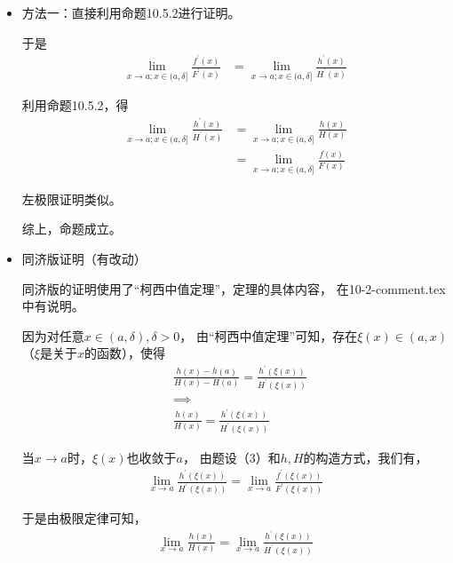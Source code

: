 \documentclass{article}
\begin{document}
\begin{itemize}
  \item  方法一：直接利用命题10.5.2进行证明。

        于是
        \begin{align*}
          \lim\limits_{x \to a; x \in (a, \delta]} \frac{f^\prime(x)}{F^\prime(x)}
           & = \lim\limits_{x \to a; x \in (a, \delta]} \frac{h^\prime(x)}{H^\prime(x)}
        \end{align*}

        利用命题10.5.2，得
        \begin{align*}
          \lim\limits_{x \to a; x \in (a, \delta]} \frac{h^\prime(x)}{H^\prime(x)}
           & = \lim\limits_{x \to a; x \in (a, \delta]} \frac{h(x)}{H(x)} \\
           & = \lim\limits_{x \to a; x \in (a, \delta]} \frac{f(x)}{F(x)}
        \end{align*}

        左极限证明类似。

        综上，命题成立。

  \item 同济版证明（有改动）

        同济版的证明使用了“柯西中值定理”，定理的具体内容，
        在10-2-comment.tex中有说明。

        因为对任意$x \in (a, \delta), \delta > 0$，
        由“柯西中值定理”可知，存在$\xi(x) \in (a, x)$（$\xi$是关于$x$的函数），使得
        \begin{align*}
           & \frac{h(x) - h(a)}{H(x) - H(a)} = \frac{h^\prime(\xi(x))}{H^\prime(\xi(x))} \\
           & \implies                                                                    \\
           & \frac{h(x)}{H(x)} = \frac{h^\prime(\xi(x))}{H^\prime(\xi(x))}
        \end{align*}

        当$x \to a$时，$\xi(x)$也收敛于$a$，
        由题设（3）和$h,H$的构造方式，我们有，
        \begin{align*}
          \lim\limits_{x \to a} \frac{h^\prime(\xi(x))}{H^\prime(\xi(x))}
          =
          \lim\limits_{x \to a} \frac{f^\prime(\xi(x))}{F^\prime(\xi(x))}
        \end{align*}

        于是由极限定律可知，
        \begin{align*}
          \lim\limits_{x \to a} \frac{h(x)}{H(x)} = \lim\limits_{x \to a} \frac{h^\prime(\xi(x))}{H^\prime(\xi(x))}
        \end{align*}


\end{itemize}
\end{document}
